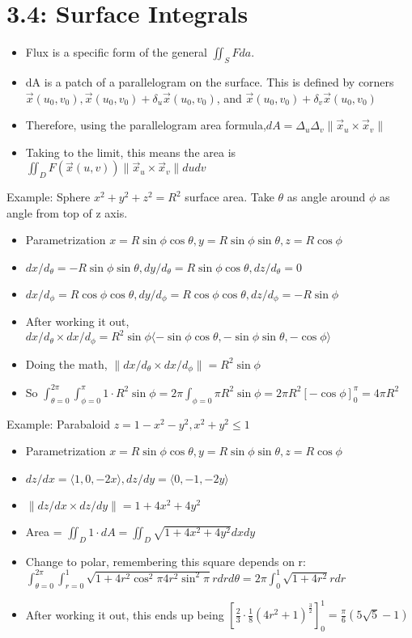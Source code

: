 \documentclass[11pt, oneside]{article}   	%
\begin{document}
\section{3.4: Surface Integrals}
\begin{itemize}
\item Flux is a specific form of the general $\iint_S F da$.
\item dA is a patch of a parallelogram on the surface.  This is defined by corners $\vec{x}(u_0, v_0), \vec{x}(u_0, v_0) + \delta_u \vec{x}(u_0, v_0)$, and $\vec{x}(u_0, v_0) + \delta_v \vec{x}(u_0, v_0)$
\item Therefore, using the parallelogram area formula,$dA = \Delta_u \Delta_v \| \vec{x}_u \times \vec{x}_v \|$
\item Taking to the limit, this means the area is $\iint_D F(\vec{x}(u,v)) \|\vec{x}_u \times \vec{x}_v \| du dv$
\end{itemize}

Example: Sphere $x^2 + y^2 + z^2 = R^2$ surface area.  Take $\theta$ as angle around $\phi$ as angle from top of z axis.
\begin{itemize}
\item Parametrization $x = R \sin \phi \cos \theta,  y = R \sin \phi \sin \theta,  z = R \cos \phi$
\item $dx/d_{\theta} =  -R \sin \phi \sin \theta, dy/d_{\theta} =  R \sin \phi \cos \theta, dz/d_{\theta} =  0$
\item $dx/d_{\phi} =  R \cos \phi \cos \theta, dy/d_{\phi} =  R \cos \phi \cos \theta, dz/d_{\phi} =  -R \sin \phi$
\item After working it out, $dx/d_{\theta} \times dx/d_{\phi} = R^2 \sin \phi \langle -\sin \phi \cos \theta,  -\sin \phi \sin \theta, -\cos \phi \rangle$ 
\item Doing the math, $ \|dx/d_{\theta} \times dx/d_{\phi} \| = R^2 \sin \phi $
\item So $\int_{\theta = 0}^{2\pi} \int_{\phi = 0}^{\pi} 1 \cdot  R^2 \sin \phi = 2 \pi \int_{\phi = 0}{\pi} R^2 \sin \phi  = 2\pi R^2 [ -\cos \phi]_0^{\pi} = 4 \pi R^2$
\end{itemize}

Example: Parabaloid $z = 1 - x^2 - y^2, x^2 + y^2 \leq 1$
\begin{itemize}
\item Parametrization $x = R \sin \phi \cos \theta,  y = R \sin \phi \sin \theta,  z = R \cos \phi$
\item $dz/dx = \langle 1, 0, -2x \rangle, dz/dy = \langle 0, -1, -2y \rangle$
\item $\| dz/dx \times dz/dy \| = 1 + 4x^2 + 4y^2$
\item Area = $\iint_D 1 \cdot dA = \iint_D \sqrt{ 1 + 4x^2 + 4y^2} dx dy$
\item Change to polar, remembering this square depends on r: $\int_{\theta = 0}^{2\pi} \int_{r = 0}^{1} \sqrt{ 1 + 4r^2 \cos^2\pi  4r^2 \sin^2\pi} r dr d\theta = 2\pi\int_0^1 \sqrt{1 + 4r^2}rdr$
\item After working it out, this ends up being $[\frac{2}{3} \cdot \frac{1}{8}(4r^2 +1)^{\frac{3}{2}}]_0^1 = \frac{\pi}{6} (5\sqrt{5} - 1)$
\end{itemize}
\end{document}
